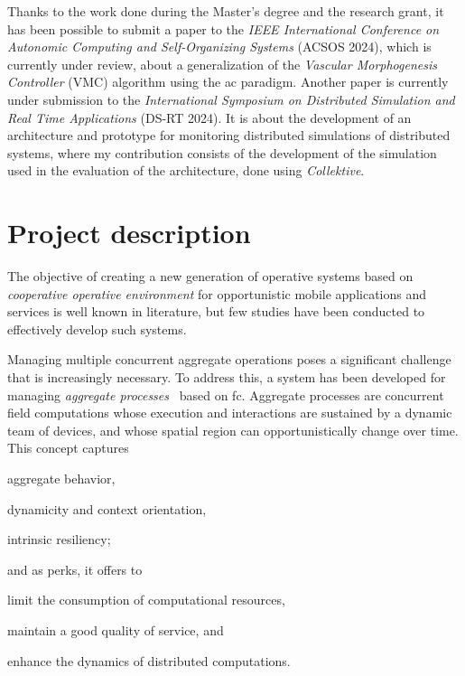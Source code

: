 \documentclass[12pt, a4paper]{article}
\newenvironment{inlinelist}{\begin{enumerate*}[label=\emph{(\roman*)}]}{\end{enumerate*}}
\begin{document}
Thanks to the work done during the Master's degree and the research grant,
it has been possible to submit a paper to the \emph{IEEE International Conference on Autonomic Computing and Self-Organizing Systems} (ACSOS 2024),
which is currently under review,
about a generalization of the \emph{Vascular Morphogenesis Controller} (VMC) algorithm using the \ac{ac} paradigm.
%
Another paper is currently under submission to the \emph{International Symposium on Distributed Simulation and Real Time Applications} (DS-RT 2024).
%
It is about the development of an architecture and prototype for monitoring distributed simulations of distributed systems,
where my contribution consists of the development of the simulation used in the evaluation of the architecture,
done using \emph{Collektive}.


\section{Project description}\label{sec:project-description}
The objective of creating a new generation of operative systems based on \emph{cooperative operative environment}
for opportunistic mobile applications and services is well known in literature,
but few studies have been conducted to effectively develop such systems.

Managing multiple concurrent aggregate operations poses a significant challenge that is increasingly necessary.
%
To address this, a system has been developed for managing \emph{aggregate processes}~\cite{aggregate-processes} based on \ac{fc}.
%
Aggregate processes are concurrent field computations whose execution and interactions are sustained by a dynamic team of devices,
and whose spatial region can opportunistically change over time.
%
This concept captures
\begin{inlinelist}
    \item aggregate behavior,
    \item dynamicity and context orientation,
    \item intrinsic resiliency;
\end{inlinelist}
and as perks, it offers to
\begin{inlinelist}
    \item limit the consumption of computational resources,
    \item maintain a good quality of service, and
    \item enhance the dynamics of distributed computations.
\end{inlinelist}
\end{document}
